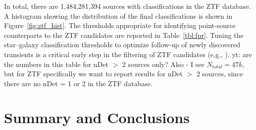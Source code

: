 \documentclass[twocolumn, dvipdfmx]{aastex62}
\newcommand{\yutaro}[1]{{\color{red} yt: {#1}}}
\begin{document}
In total, there are 1,484,281,394 sources with classifications in the ZTF
database. A histogram showing the distribution of the final classifications
is shown in Figure~\ref{fig:ztf_hist}. The thresholds appropriate for
identifying point-source counterparts to the ZTF candidates are reported in
Table~\ref{tbl:fpr}. Tuning the star--galaxy classification thresholds to
optimize follow-up of newly discovered transients is a critical early step
in the filtering of ZTF candidates (e.g., \citealt{Kasliwal:18:ZTF}).
\yutaro{are the numbers in this table for nDet $>$ 2 sources only? Also - I
see $N_{total} = 47k$, but for ZTF specifically we want to report results
for nDet $>$ 2 sources, since there are no nDet = 1 or 2 in the ZTF
database.}


\section{Summary and Conclusions}
\end{document}
